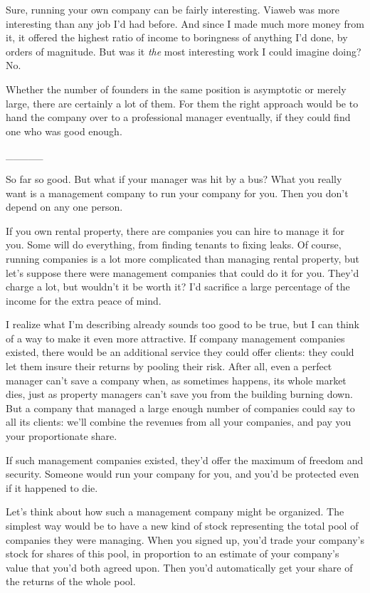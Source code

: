 Sure, running your own company can be fairly interesting. Viaweb was
more interesting than any job I'd had before. And since I made much more
money from it, it offered the highest ratio of income to boringness of
anything I'd done, by orders of magnitude. But was it \emph{the} most
interesting work I could imagine doing? No.~

Whether the number of founders in the same position is asymptotic or
merely large, there are certainly a lot of them. For them the right
approach would be to hand the company over to a professional manager
eventually, if they could find one who was good enough.

\_\_\_\_\_

So far so good. But what if your manager was hit by a bus? What you
really want is a management company to run your company for you. Then
you don't depend on any one person.

If you own rental property, there are companies you can hire to manage
it for you. Some will do everything, from finding tenants to fixing
leaks. Of course, running companies is a lot more complicated than
managing rental property, but let's suppose there were management
companies that could do it for you. They'd charge a lot, but wouldn't it
be worth it? I'd sacrifice a large percentage of the income for the
extra peace of mind.

I realize what I'm describing already sounds too good to be true, but I
can think of a way to make it even more attractive. If company
management companies existed, there would be an additional service they
could offer clients: they could let them insure their returns by pooling
their risk. After all, even a perfect manager can't save a company when,
as sometimes happens, its whole market dies, just as property managers
can't save you from the building burning down. But a company that
managed a large enough number of companies could say to all its clients:
we'll combine the revenues from all your companies, and pay you your
proportionate share.

If such management companies existed, they'd offer the maximum of
freedom and security. Someone would run your company for you, and you'd
be protected even if it happened to die.

Let's think about how such a management company might be organized. The
simplest way would be to have a new kind of stock representing the total
pool of companies they were managing. When you signed up, you'd trade
your company's stock for shares of this pool, in proportion to an
estimate of your company's value that you'd both agreed upon. Then you'd
automatically get your share of the returns of the whole pool.

